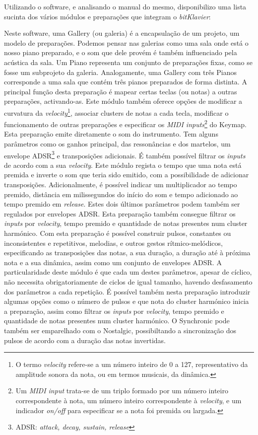 \documentclass[../main.tex]{subfiles}
\begin{document}
Utilizando o software, e analisando o manual do mesmo\cite{bk2018}, disponibilizo uma lista sucinta dos vários módulos e preparações que integram o \textit{bitKlavier}:
\begin{description}
     Neste software, uma Gallery (ou galeria) é a encapsulação de um projeto, um modelo de preparações. Podemos pensar nas galerias como uma sala onde está o nosso piano preparado, e o som que dele provém é também influenciado pela acústica da sala.
     Um Piano representa um conjunto de preparações fixas, como se fosse um subprojeto da galeria. Analogamente, uma Gallery com três Pianos corresponde a uma sala que contém três pianos preparados de forma distinta.
     A principal função desta preparação é mapear certas teclas (ou notas) a outras preparações, activando-as. Este módulo também oferece opções de modificar a curvatura da \textit{velocity}\footnote{O termo \textit{velocity} refere-se a um número inteiro de 0 a 127, representativo da amplitude sonora da nota, ou em termos musicais, da dinâmica.}, associar clusters de notas a cada tecla, modificar o funcionamento de outras preparações e especificar os \textit{MIDI inputs}\footnote{Um \textit{MIDI input} trata-se de um triplo formado por um número inteiro correspondente à nota, um número inteiro correspondente à \textit{velocity}, e um indicador \textit{on/off} para especificar se a nota foi premida ou largada.} do Keymap.
     Esta preparação emite diretamente o som do instrumento. Tem alguns parâmetros como os ganhos principal, das ressonâncias e dos martelos, um envelope ADSR\footnote{ADSR: \textit{attack, decay, sustain, release}} e transposições adicionais. É também possível filtrar os \textit{inputs} de acordo com a sua \textit{velocity}.
     Este módulo regista o tempo que uma nota está premida e inverte o som que teria sido emitido, com a possibilidade de adicionar transposições. Adicionalmente, é possível indicar um multiplicador ao tempo premido, distância em milissegundos do início do som e tempo adicionado ao tempo premido em \textit{release}. Estes dois últimos parâmetros podem também ser regulados por envelopes ADSR. Esta preparação também consegue filtrar os \textit{inputs} por \textit{velocity}, tempo premido e quantidade de notas presentes num cluster harmónico.
     Com esta preparação é possível construir pulsos, constantes ou inconsistentes e repetitivos, melodias, e outros gestos rítmico-melódicos, especificando as transposições das notas, a sua duração, a duração até à próxima nota e a sua dinâmica, assim como um conjunto de envelopes ADSR. A particularidade deste módulo é que cada um destes parâmetros, apesar de cíclico, não necessita obrigatoriamente de ciclos de igual tamanho, havendo desfasamento dos parâmetros a cada repetição. É possível também nesta preparação introduzir algumas opções como o número de pulsos e que nota do cluster harmónico inicia a preparação, assim como filtrar os \textit{inputs} por \textit{velocity}, tempo premido e quantidade de notas presentes num cluster harmónico. O Synchronic pode também ser emparelhado com o Nostalgic, possibiltando a sincronização dos pulsos de acordo com a duração das notas invertidas.

\end{description}
\end{document}
